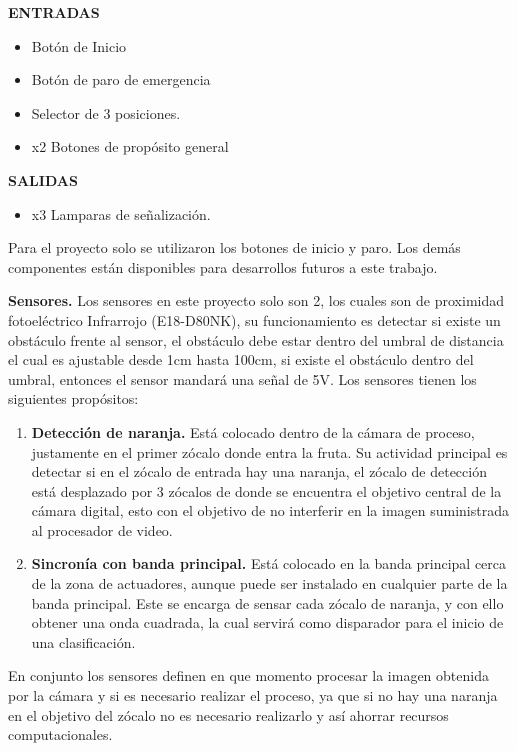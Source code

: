 \documentclass[twoside,spanish,ESP,MSc]{plantillaLabUPV}
\theoremstyle{definition}
\begin{document}
\textbf{ENTRADAS}
\begin{multicols}{2}
\begin{itemize}	
	\item Botón de Inicio
	\item Botón de paro de emergencia
	\item Selector de 3 posiciones.
	\item x2 Botones de propósito general
\end{itemize}
\end{multicols}

\textbf{SALIDAS}
\begin{itemize}
	\item x3 Lamparas de señalización.
\end{itemize}

Para el proyecto solo se utilizaron los botones de inicio y paro. Los demás componentes están disponibles para desarrollos futuros a este trabajo.


\checkmark\textbf{Sensores.} Los sensores en este proyecto solo son 2, los cuales son de proximidad fotoeléctrico Infrarrojo (E18-D80NK), su funcionamiento es detectar si existe un obstáculo frente al sensor, el obstáculo debe estar dentro del umbral de distancia el cual es ajustable desde 1cm hasta 100cm, si existe el obstáculo dentro del umbral, entonces el sensor mandará una señal de 5V. Los sensores tienen los siguientes propósitos:

\begin{enumerate}
	\item \textbf{Detección de naranja.}
	Está colocado dentro de la cámara de proceso, justamente en el primer zócalo donde entra la fruta. Su actividad principal es detectar si en el zócalo de entrada hay una naranja, el zócalo de detección está desplazado por 3 zócalos de donde se encuentra el objetivo central de la cámara digital, esto con el objetivo de no interferir en la imagen suministrada al procesador de video.
	\item \textbf{Sincronía con banda principal.}
	Está colocado en la banda principal cerca de la zona de actuadores, aunque puede ser instalado en cualquier parte de la banda principal. Este se encarga de sensar cada zócalo de naranja, y con ello obtener una onda cuadrada, la cual servirá como disparador para el inicio de una clasificación.
\end{enumerate} 

En conjunto los sensores definen en que momento procesar la imagen obtenida por la cámara y si es necesario realizar el proceso, ya que si no hay una naranja en el objetivo del zócalo no es necesario realizarlo y así ahorrar recursos computacionales.
\end{document}
